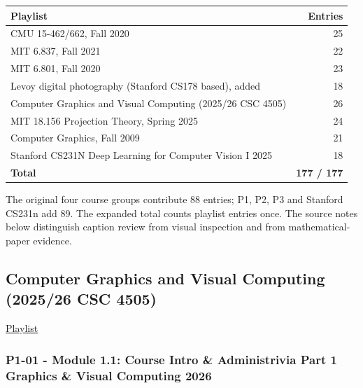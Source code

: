 \hypertarget{04-visual-computing-ii-ch036-expanded-coverage-across-eight-course-playlists}{}

{\def\LTcaptype{none} %
\begin{longtable}[]{@{}lr@{}}
\toprule\noalign{}
Playlist & Entries \\
\midrule\noalign{}
\endhead
\bottomrule\noalign{}
\endlastfoot
CMU 15-462/662, Fall 2020 & 25 \\
MIT 6.837, Fall 2021 & 22 \\
MIT 6.801, Fall 2020 & 23 \\
Levoy digital photography (Stanford CS178 based), added & 18 \\
Computer Graphics and Visual Computing (2025/26 CSC 4505) & 26 \\
MIT 18.156 Projection Theory, Spring 2025 & 24 \\
Computer Graphics, Fall 2009 & 21 \\
Stanford CS231N Deep Learning for Computer Vision I 2025 & 18 \\
\textbf{Total} & \textbf{177 / 177} \\
\end{longtable}
}

The original four course groups contribute 88 entries; P1, P2, P3 and Stanford CS231n add 89. The expanded total counts playlist entries once. The source notes below distinguish caption review from visual inspection and from mathematical-paper evidence.

\subsection{Computer Graphics and Visual Computing (2025/26 CSC 4505)}\label{04-visual-computing-ii-ch036-computer-graphics-and-visual-computing-202526-csc-4505}

\hypertarget{04-visual-computing-ii-ch036-computer-graphics-and-visual-computing-202526-csc-4505}{}

\href{https://www.youtube.com/playlist?list=PLubb3AIPdPhYu-auUzK10YzvERCshyQ9M}{Playlist}

\subsubsection{P1-01 - Module 1.1: Course Intro \& Administrivia Part 1 Graphics \& Visual Computing 2026}\label{04-visual-computing-ii-ch036-p1-01---module-1.1-course-intro-administrivia-part-1-graphics-visual-computing-2026}


